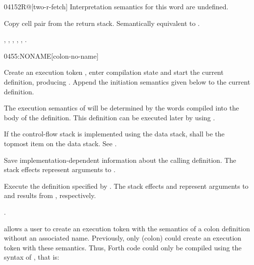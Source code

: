 \begin{worddef}{0415}{2R@}[two-r-fetch]
\interpret
	Interpretation semantics for this word are undefined.

\execute

	Copy cell pair  from the return stack.
	Semantically equivalent to   
	  .

\see {},
	,
	,
	,
	,
	.
\end{worddef}


\begin{worddef}{0455}{:NONAME}[colon-no-name]
\item {}

	Create an execution token , enter compilation state
	and start the current definition, producing .
	Append the initiation semantics given below to the current
	definition.

	The execution semantics of  will be determined by the
	words compiled into the body of the definition. This definition
	can be executed later by using  .

	If the control-flow stack is implemented using the data stack,
	 shall be the topmost item on the data stack.
	See .

\init

	Save implementation-dependent information 
	about the calling definition. The stack effects 
	represent arguments to .

\execute[xt]

	Execute the definition specified by . The stack
	effects  and  represent arguments to
	and results from , respectively.

\see {}.

	\begin{rationale} %
		 allows a user to create an execution token
		with the semantics of a colon definition without an associated
		name. Previously, only \word{:} (colon) could create an
		execution token with these semantics. Thus, Forth code could
		only be compiled using the syntax of \word{:}, that is:


\end{rationale}
\end{worddef}
